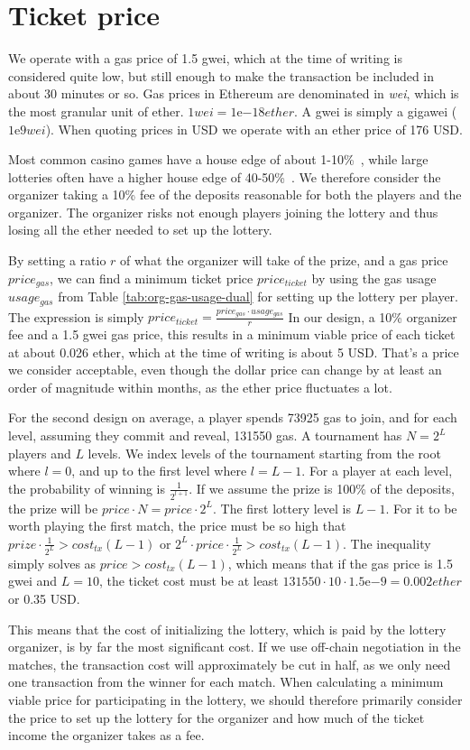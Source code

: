 \section{Ticket price}
\label{sec:ticket-price}

We operate with a gas price of 1.5 gwei, which at the time of writing is considered quite low, but still enough to make the transaction be included in about 30 minutes or so. Gas prices in Ethereum are denominated in \emph{wei}, which is the most granular unit of ether. $1 wei=1 \mathrm{e}{-18} ether$. A gwei is simply a gigawei ($1\mathrm{e}{9} wei$). When quoting prices in USD we operate with an ether price of 176 USD. 

Most common casino games have a house edge of about 1-10\%~\cite{walsh_houses_nodate}, while large lotteries often have a higher house edge of 40-50\%~\cite{shackleford_house_nodate}. We therefore consider the organizer taking a 10\% fee of the deposits reasonable for both the players and the organizer. The organizer risks not enough players joining the lottery and thus losing all the ether needed to set up the lottery. 

By setting a ratio $r$ of what the organizer will take of the prize, and a gas price $price_{gas}$, we can find a minimum ticket price $price_{ticket}$ by using the gas usage $usage_{gas}$ from Table \ref{tab:org-gas-usage-dual} for setting up the lottery per player. The expression is simply $price_{ticket}=\frac{price_{gas} \cdot usage_{gas}}{r}$
In our design, a 10\% organizer fee and a 1.5 gwei gas price, this results in a minimum viable price of each ticket at about 0.026 ether, which at the time of writing is about 5 USD. That's a price we consider acceptable, even though the dollar price can change by at least an order of magnitude within months, as the ether price fluctuates a lot. 

For the second design on average, a player spends 73925 gas to join, and for each level, assuming they commit and reveal, 131550 gas. A tournament has $N=2^L$ players and $L$ levels. We index levels of the tournament starting from the root where $l=0$, and up to the first level where $l=L-1$. For a player at each level, the probability of winning is $\frac{1}{2^{l+1}}$. If we assume the prize is 100\% of the deposits, the prize will be $price \cdot N=price \cdot 2^L$. The first lottery level is $L-1$. For it to be worth playing the first match, the price must be so high that $prize \cdot \frac{1}{2^L} > cost_{tx}(L-1)$ or $2^L \cdot price \cdot \frac{1}{2^L} > cost_{tx}(L-1)$. The inequality simply solves as $price > cost_{tx}(L-1)$, which means that if the gas price is 1.5 gwei and $L=10$, the ticket cost must be at least $131550 \cdot 10 \cdot 1.5 \mathrm{e}{-9}=0.002 ether$ or 0.35 USD. 

This means that the cost of initializing the lottery, which is paid by the lottery organizer, is by far the most significant cost. If we use off-chain negotiation in the matches, the transaction cost will approximately be cut in half, as we only need one transaction from the winner for each match. When calculating a minimum viable price for participating in the lottery, we should therefore primarily consider the price to set up the lottery for the organizer and how much of the ticket income the organizer takes as a fee.
